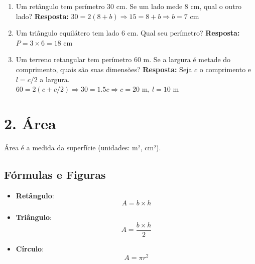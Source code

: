 \documentclass[11pt]{article}
\begin{document}
\begin{multicols}{2}
\begin{enumerate}[label=\alph*)]
    \item  Um retângulo tem perímetro 30 cm. Se um lado mede 8 cm, qual o outro lado?
    \textbf{Resposta:} $30 = 2(8 + b) \Rightarrow 15 = 8 + b \Rightarrow b = 7$ cm
    
    \item  Um triângulo equilátero tem lado 6 cm. Qual seu perímetro?
    \textbf{Resposta:} $P = 3 \times 6 = 18$ cm
     
    \item  Um terreno retangular tem perímetro 60 m. Se a largura é metade do comprimento, quais são suas dimensões?
    \textbf{Resposta:} Seja $c$ o comprimento e $l = c/2$ a largura. \\
    $60 = 2(c + c/2) \Rightarrow 30 = 1.5c \Rightarrow c = 20$ m, $l = 10$ m
\end{enumerate}

\section*{2. Área}
Área é a medida da superfície (unidades: m², cm²).

\subsection*{Fórmulas e Figuras}
\begin{itemize}
    \item \textbf{Retângulo}:
    \[
    A = b \times h
    \]
    \begin{center}
    \end{center}
    
    \item \textbf{Triângulo}:
    \[
    A = \frac{b \times h}{2}
    \]
    \begin{center}
    \end{center}
    
    \item \textbf{Círculo}:
    \[
    A = \pi r^2
    \]
    \begin{center}
    \end{center}


\end{itemize}
\end{multicols}
\end{document}

